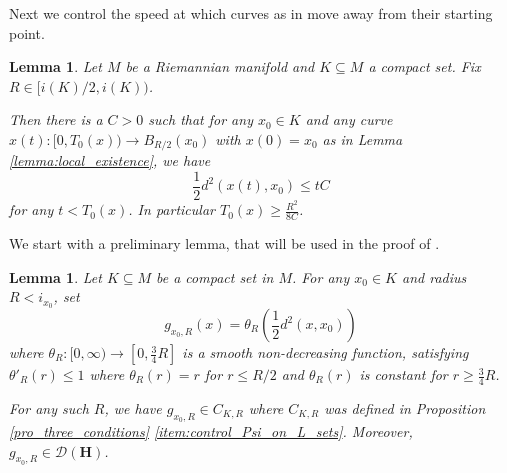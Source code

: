 \documentclass[a4paper]{article}
\numberwithin{equation}{section}
\newtheorem{lemma}[theorem]{Lemma}
\theoremstyle{definition}
\begin{document}
Next we control the speed at which curves as in 
move away from their starting point. 


\begin{lemma} \label{lemma:control_on_local_curves}
Let $M$ be a Riemannian manifold and $K\subseteq M$ a compact set. Fix $R \in [i(K)/2,i(K))$. 

Then there is a $C > 0$ such that for any $x_0 \in K$ and any curve $x(t) : [0,T_0(x)) \rightarrow B_{R/2}(x_0)$ with $x(0) = x_0$ as in Lemma \ref{lemma:local_existence}, we have
\begin{equation*}
    \frac{1}{2}d^2(x(t),x_0) \leq t C
\end{equation*}
for any $t < T_0(x)$. In particular $T_0(x) \geq \frac{R^2}{8C}$.
\end{lemma}

We start with a preliminary lemma, that will be used in the proof of .

\begin{lemma} \label{lemma:smooth_distance_cutoff}
Let $K \subseteq M$ be a compact set in $M$. For any $x_0 \in K$ and radius $R < i_{x_0}$, set
\begin{equation*}
    g_{x_0,R}(x) = \theta_R\left(\frac{1}{2}d^2(x,x_0)\right)
\end{equation*}
where $\theta_R : [0,\infty) \rightarrow [0,\frac{3}{4}R]$ is a smooth non-decreasing function, satisfying $\theta'_R(r) \leq 1$ where $\theta_R(r) = r$ for $r \leq R/2$ and $\theta_R(r)$ is constant for $r \geq \frac{3}{4}R$.

For any such $R$, we have $g_{x_0,R} \in C_{K,R}$ where $C_{K,R}$ was defined in Proposition \ref{pro_three_conditions} \ref{item:control_Psi_on_L_sets}. Moreover, $g_{x_0,R}\in \mathcal{D}(\mathbf{H})$.
\end{lemma}
\end{document}
